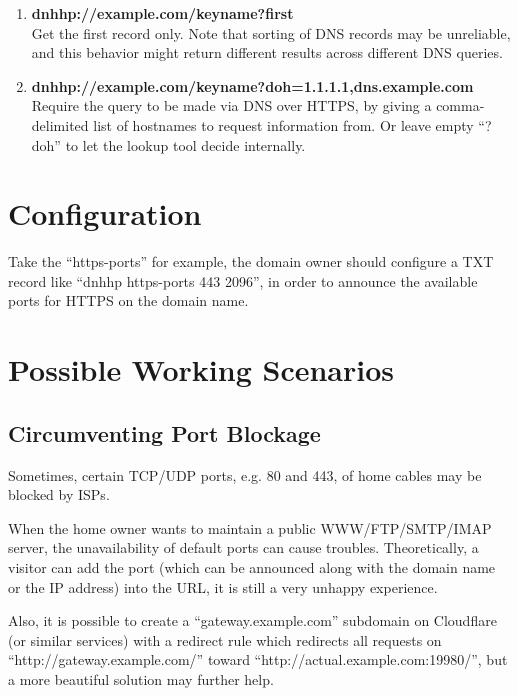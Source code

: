 \documentclass[a4paper,11pt]{article}
\begin{document}
\begin{enumerate}
	\item \textbf{dnhhp://example.com/keyname?first}\\
	      Get the first record only.
	      Note that sorting of DNS records may be unreliable,
	      and this behavior might return different results across different DNS queries.
	\item \textbf{dnhhp://example.com/keyname?doh=1.1.1.1,dns.example.com}\\
	      Require the query to be made via DNS over HTTPS,
	      by giving a comma-delimited list of hostnames to request information from.
          Or leave empty ``?doh'' to let the lookup tool decide internally.
\end{enumerate}







\section{Configuration}

Take the ``https-ports'' for example, the domain owner should configure a TXT record like ``dnhhp https-ports 443 2096'',
in order to announce the available ports for HTTPS on the domain name.







\section{Possible Working Scenarios}

\subsection{Circumventing Port Blockage}

Sometimes, certain TCP/UDP ports, e.g. 80 and 443, of home cables may be blocked by ISPs.

When the home owner wants to maintain a public WWW/FTP/SMTP/IMAP server, the unavailability of default ports can cause troubles.
Theoretically, a visitor can add the port (which can be announced along with the domain name or the IP address) into the URL,
it is still a very unhappy experience.

Also, it is possible to create a ``gateway.example.com'' subdomain on Cloudflare (or similar services) with a redirect rule
which redirects all requests on ``http://gateway.example.com/'' toward ``http://actual.example.com:19980/'',
but a more beautiful solution may further help.
\end{document}
